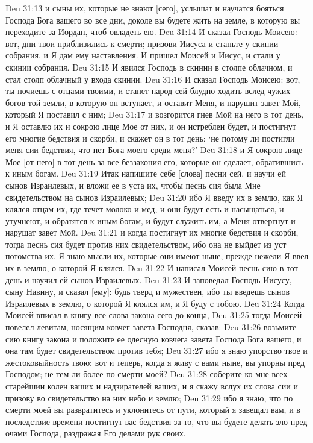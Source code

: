 Deu 31:13  и сыны их, которые не знают [сего], услышат и научатся бояться Господа Бога вашего во все дни, доколе вы будете жить на земле, в которую вы переходите за Иордан, чтоб овладеть ею.
Deu 31:14  И сказал Господь Моисею: вот, дни твои приблизились к смерти; призови Иисуса и станьте у скинии собрания, и Я дам ему наставления. И пришел Моисей и Иисус, и стали у скинии собрания.
Deu 31:15  И явился Господь в скинии в столпе облачном, и стал столп облачный у входа скинии.
Deu 31:16  И сказал Господь Моисею: вот, ты почиешь с отцами твоими, и станет народ сей блудно ходить вслед чужих богов той земли, в которую он вступает, и оставит Меня, и нарушит завет Мой, который Я поставил с ним;
Deu 31:17  и возгорится гнев Мой на него в тот день, и Я оставлю их и сокрою лице Мое от них, и он истреблен будет, и постигнут его многие бедствия и скорби, и скажет он в тот день: `не потому ли постигли меня сии бедствия, что нет Бога моего среди меня?'
Deu 31:18  и Я сокрою лице Мое [от него] в тот день за все беззакония его, которые он сделает, обратившись к иным богам.
Deu 31:19  Итак напишите себе [слова] песни сей, и научи ей сынов Израилевых, и вложи ее в уста их, чтобы песнь сия была Мне свидетельством на сынов Израилевых;
Deu 31:20  ибо Я введу их в землю, как Я клялся отцам их, где течет молоко и мед, и они будут есть и насыщаться, и утучнеют, и обратятся к иным богам, и будут служить им, а Меня отвергнут и нарушат завет Мой.
Deu 31:21  и когда постигнут их многие бедствия и скорби, тогда песнь сия будет против них свидетельством, ибо она не выйдет из уст потомства их. Я знаю мысли их, которые они имеют ныне, прежде нежели Я ввел их в землю, о которой Я клялся.
Deu 31:22  И написал Моисей песнь сию в тот день и научил ей сынов Израилевых.
Deu 31:23  И заповедал Господь Иисусу, сыну Навину, и сказал [ему]: будь тверд и мужествен, ибо ты введешь сынов Израилевых в землю, о которой Я клялся им, и Я буду с тобою.
Deu 31:24  Когда Моисей вписал в книгу все слова закона сего до конца,
Deu 31:25  тогда Моисей повелел левитам, носящим ковчег завета Господня, сказав:
Deu 31:26  возьмите сию книгу закона и положите ее одесную ковчега завета Господа Бога вашего, и она там будет свидетельством против тебя;
Deu 31:27  ибо я знаю упорство твое и жестоковыйность твою: вот и теперь, когда я живу с вами ныне, вы упорны пред Господом; не тем ли более по смерти моей?
Deu 31:28  соберите ко мне всех старейшин колен ваших и надзирателей ваших, и я скажу вслух их слова сии и призову во свидетельство на них небо и землю;
Deu 31:29  ибо я знаю, что по смерти моей вы развратитесь и уклонитесь от пути, который я завещал вам, и в последствие времени постигнут вас бедствия за то, что вы будете делать зло пред очами Господа, раздражая Его делами рук своих.
